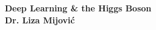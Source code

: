 \documentclass[11pt,xcolor=dvipsnames,aspectratio=169]{beamer}
\begin{document}
{
%
\begin{frame}
  \begin{center}
    \setlength{\parskip}{0pt}
    \vspace{10pt}
    {\Huge\bf Deep Learning \& the Higgs Boson}\\[0.1\textheight]
    {\huge \bf Dr. Liza Mijovi\'c}
  \end{center}
\end{frame}
}
\end{document}
